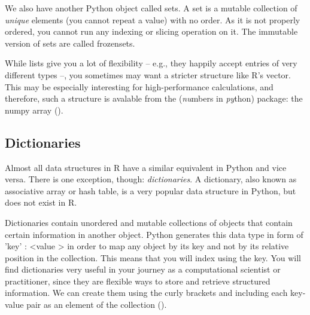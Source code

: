 


We also have another Python object called sets. A set is a mutable
collection of \emph{unique} elements (you cannot repeat a value) with
no order. As it is not properly ordered, you cannot run any indexing
or slicing operation on it. The immutable version of sets are called
frozensets.



While lists give you a lot of flexibility -- e.g., they happily accept
entries of very different types --, you sometimes may want a stricter
structure like R's vector. This may be especially interesting for
high-performance calculations, and therefore, such a structure is
avalable from the  (\emph{nu}mbers in \emph{py}thon)
package: the numpy array ().




\subsection{Dictionaries}
Almost all data structures in R have a similar equivalent in Python
and vice versa. There is one exception, though: \emph{dictionaries}. A
dictionary, also known as associative array or hash table, is a very
popular data structure in Python, but does not exist in R.

Dictionaries contain unordered and mutable collections of objects that
contain certain information in another object. Python generates this
data type in form of { 'key' : \textless value \textgreater} in order
to map any object by its key and not by its relative position in the
collection. This means that you will index using the key. You will
find dictionaries very useful in your journey as a computational
scientist or practitioner, since they are flexible ways to store and
retrieve structured information. We can create them using the curly
brackets {} and including each key-value pair as an element of the
collection ().

